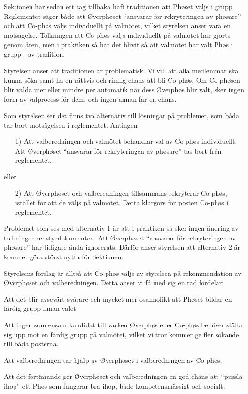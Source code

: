 \documentclass[../_main/handlingar.tex]{subfiles}
\begin{document}

Sektionen har sedan ett tag tillbaka haft traditionen att Phøset väljs i grupp. Reglementet säger både att Øverphøset ``ansvarar för rekryteringen av phøsare'' och att Co-phøs väljs individuellt på valmötet, vilket styrelsen anser vara en motsägelse. Tolkningen att Co-phøs väljs individuellt på valmötet har gjorts genom åren, men i praktiken så har det blivit så att valmötet har valt Phøs i grupp - av tradition.

Styrelsen anser att traditionen är problematisk. Vi vill att alla medlemmar ska kunna söka samt ha en rättvis och rimlig chans att bli Co-phøs. Om Co-phøsen blir valda mer eller mindre per automatik när dess Øverphøs blir valt, sker ingen form av valprocess för dem, och ingen annan får en chans.

Som styrelsen ser det finns två alternativ till lösningar på problemet, som båda tar bort motsägelsen i reglementet. Antingen
\begin{itemize}
    \item[1)] Att valberedningen och valmötet behandlar val av Co-phøs individuellt. Att Øverphøset ``ansvarar för rekryteringen av phøsare'' tas bort från reglementet.
\end{itemize}
eller
\begin{itemize}
    \item[2)] Att Øverphøset och valberedningen tillsammans rekryterar Co-phøs, istället för att de väljs på valmötet. Detta klargörs för posten Co-phøs i reglementet.
\end{itemize}

Problemet som ses med alternativ 1 är att i praktiken så sker ingen ändring av tolkningen av styrdokumenten. Att Øverphøset ``ansvarar för rekryteringen av phøsare'' har tidigare ändå ignorerats. Därför anser styrelsen att alternativ 2 är kommer göra störst nytta för Sektionen.

Styrelsens förslag är alltså att Co-phøs väljs av styrelsen på rekommendation  av Øverphøset och valberedningen. Detta anser vi få med sig en rad fördelar:

\begin{dashlist}
    \item Att det blir avsevärt svårare och mycket mer osannolikt att Phøset bildar en färdig grupp innan valet.
    \item Att ingen som ensam kandidat till varken Øverphøs eller Co-phøs behöver ställa sig upp mot en färdig grupp på valmötet, vilket vi tror kommer ge fler sökande till båda posterna.
    \item Att valberedningen tar hjälp av Øverphøset i valberedningen av Co-phøs.
    \item Att det fortfarande ger Øverphøset och valberedningen en god chans att ``pussla ihop'' ett Phøs som fungerar bra ihop, både kompetensmässigt och socialt.
\end{dashlist}
\end{document}
